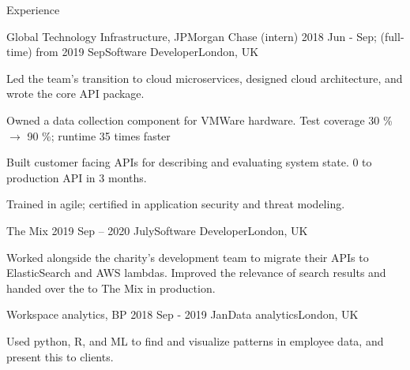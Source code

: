\documentclass[10pt]{resume} %
\begin{document}
\begin{rSection}{Experience}


  \begin{rSubsection}{Global Technology Infrastructure, JPMorgan Chase}
    {(intern) 2018 Jun - Sep; (full-time) from 2019 Sep}{Software Developer}{London, UK}
  \item Led the team's transition to cloud microservices, designed cloud
    architecture, and wrote the core API package.
  \item Owned a data collection component for VMWare hardware. Test coverage 30
    \% $\rightarrow$ 90 \%; runtime 35 times faster
  \item Built customer facing APIs for describing and evaluating system state.
    0 to production API in 3 months.
  \item Trained in agile; certified in application security and threat modeling.
  \end{rSubsection}


  \begin{rSubsection}{The Mix}
    {2019 Sep -- 2020 July}{Software Developer}{London, UK}
  \item Worked alongside the charity's development team to migrate their
    APIs to ElasticSearch and AWS lambdas. Improved the relevance of search
    results and handed over the to The Mix in production.
  \end{rSubsection}


  \begin{rSubsection}{Workspace analytics, BP}
    {2018 Sep - 2019 Jan}{Data analytics}{London, UK}
  \item Used python, R, and ML to find and visualize patterns in employee data,
    and present this to clients.
  \end{rSubsection}


\end{rSection}
\end{document}
